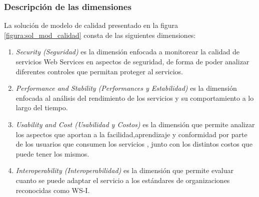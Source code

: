 \subsubsection{Descripción de las dimensiones}
La solución de modelo de calidad presentado en la figura \ref{figura:sol_mod_calidad} consta de las siguientes dimensiones: 
		\begin{enumerate}
			\item \emph{Security (Seguridad)} es la dimensión enfocada a monitorear la calidad de servicios Web Services en aspectos de seguridad, de forma de poder analizar diferentes controles que permitan proteger al servicios.
			\item  \emph{Performance and Stability (Performances y Estabilidad)} es la dimensión enfocada al análisis del rendimiento de los servicios y su comportamiento a lo largo del tiempo.
			\item  \emph{Usability and Cost (Usabilidad y Costos)} es la dimensión que permite analizar los aspectos que aportan a la facilidad,aprendizaje y conformidad por parte de los usuarios que consumen los servicios , junto con los distintos costos que puede tener los mismos.
			\item  \emph{Interoperability (Interoperabilidad)} es la dimensión que permite evaluar cuanto se puede adaptar el servicio a los estándares de organizaciones reconocidas como WS-I.
		\end{enumerate}


